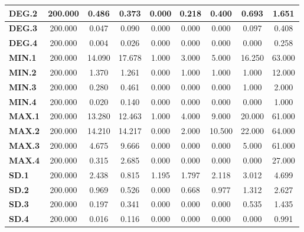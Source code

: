 \documentclass[
	article,			%
	11pt,				%
	oneside,			%
	a4paper,			%
	english,			%
	brazil,				%
	sumario=tradicional
	]{abntex2}
\begin{document}
\begin{table}[H]
\begin{tabular}{l|c|c|c|c|c|c|c|c|}
\multicolumn{1}{|l|}{\textbf{DEG.2}}  & 200.000 & 0.486    & 0.373    & 0.000   & 0.218   & 0.400    & 0.693    & 1.651     \\ \hline
\multicolumn{1}{|l|}{\textbf{DEG.3}}  & 200.000 & 0.047    & 0.090    & 0.000   & 0.000   & 0.000    & 0.097    & 0.408     \\ \hline
\multicolumn{1}{|l|}{\textbf{DEG.4}}  & 200.000 & 0.004    & 0.026    & 0.000   & 0.000   & 0.000    & 0.000    & 0.258     \\ \hline
\multicolumn{1}{|l|}{\textbf{MIN.1}}  & 200.000 & 14.090   & 17.678   & 1.000   & 3.000   & 5.000    & 16.250   & 63.000    \\ \hline
\multicolumn{1}{|l|}{\textbf{MIN.2}}  & 200.000 & 1.370    & 1.261    & 0.000   & 1.000   & 1.000    & 1.000    & 12.000    \\ \hline
\multicolumn{1}{|l|}{\textbf{MIN.3}}  & 200.000 & 0.280    & 0.461    & 0.000   & 0.000   & 0.000    & 1.000    & 2.000     \\ \hline
\multicolumn{1}{|l|}{\textbf{MIN.4}}  & 200.000 & 0.020    & 0.140    & 0.000   & 0.000   & 0.000    & 0.000    & 1.000     \\ \hline
\multicolumn{1}{|l|}{\textbf{MAX.1}}  & 200.000 & 13.280   & 12.463   & 1.000   & 4.000   & 9.000    & 20.000   & 61.000    \\ \hline
\multicolumn{1}{|l|}{\textbf{MAX.2}}  & 200.000 & 14.210   & 14.217   & 0.000   & 2.000   & 10.500   & 22.000   & 64.000    \\ \hline
\multicolumn{1}{|l|}{\textbf{MAX.3}}  & 200.000 & 4.675    & 9.666    & 0.000   & 0.000   & 0.000    & 5.000    & 61.000    \\ \hline
\multicolumn{1}{|l|}{\textbf{MAX.4}}  & 200.000 & 0.315    & 2.685    & 0.000   & 0.000   & 0.000    & 0.000    & 27.000    \\ \hline
\multicolumn{1}{|l|}{\textbf{SD.1}}   & 200.000 & 2.438    & 0.815    & 1.195   & 1.797   & 2.118    & 3.012    & 4.699     \\ \hline
\multicolumn{1}{|l|}{\textbf{SD.2}}   & 200.000 & 0.969    & 0.526    & 0.000   & 0.668   & 0.977    & 1.312    & 2.627     \\ \hline
\multicolumn{1}{|l|}{\textbf{SD.3}}   & 200.000 & 0.197    & 0.341    & 0.000   & 0.000   & 0.000    & 0.535    & 1.435     \\ \hline
\multicolumn{1}{|l|}{\textbf{SD.4}}   & 200.000 & 0.016    & 0.116    & 0.000   & 0.000   & 0.000    & 0.000    & 0.991     \\ \hline

\end{tabular}
\end{table}
\end{document}
